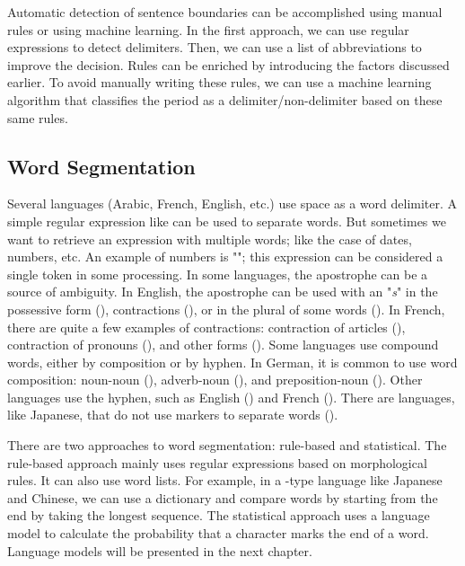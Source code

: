 \documentclass{KBook}
\begin{document}
Automatic detection of sentence boundaries can be accomplished using manual rules or using machine learning. In the first approach, we can use regular expressions to detect delimiters. Then, we can use a list of abbreviations to improve the decision. Rules can be enriched by introducing the factors discussed earlier. To avoid manually writing these rules, we can use a machine learning algorithm that classifies the period as a delimiter/non-delimiter based on these same rules.


\subsection{Word Segmentation}

Several languages (Arabic, French, English, etc.) use space as a word delimiter. 
A simple regular expression like \expword{/[ ]+/} can be used to separate words. 
But sometimes we want to retrieve an expression with multiple words; like the case of dates, numbers, etc. 
An example of numbers is ""; this expression can be considered a single token in some processing. 
In some languages, the apostrophe can be a source of ambiguity. In English, the apostrophe can be used with an "\textit{s}" in the possessive form (), contractions (), or in the plural of some words (). In French, there are quite a few examples of contractions: contraction of articles (), contraction of pronouns (), and other forms (). Some languages use compound words, either by composition or by hyphen. In German, it is common to use word composition: noun-noun (), adverb-noun (), and preposition-noun (). Other languages use the hyphen, such as English () and French (). There are languages, like Japanese, that do not use markers to separate words ().

There are two approaches to word segmentation: rule-based and statistical. The rule-based approach mainly uses regular expressions based on morphological rules. It can also use word lists. For example, in a -type language like Japanese and Chinese, we can use a dictionary and compare words by starting from the end by taking the longest sequence. The statistical approach uses a language model to calculate the probability that a character marks the end of a word. Language models will be presented in the next chapter.
\end{document}
